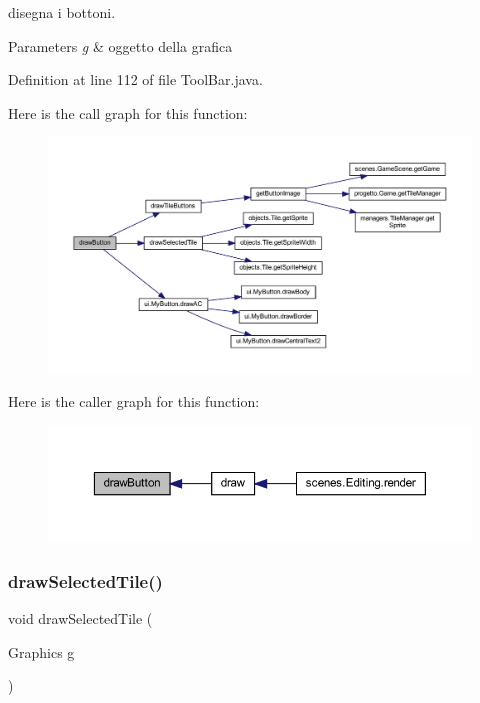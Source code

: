 disegna i bottoni. 


\begin{DoxyParams}{Parameters}
{\em g} & oggetto della grafica \\
\hline
\end{DoxyParams}


Definition at line 112 of file Tool\+Bar.\+java.

Here is the call graph for this function\+:
\nopagebreak
\begin{figure}[H]
\begin{center}
\leavevmode
\includegraphics[width=350pt]{classui_1_1_tool_bar_a65768678909bc0512c6cb9780709ad38_cgraph}
\end{center}
\end{figure}
Here is the caller graph for this function\+:\nopagebreak
\begin{figure}[H]
\begin{center}
\leavevmode
\includegraphics[width=350pt]{classui_1_1_tool_bar_a65768678909bc0512c6cb9780709ad38_icgraph}
\end{center}
\end{figure}
\mbox{\label{classui_1_1_tool_bar_aa0f35d91a41dfb53af7bdd7d4a76916f}} 
\subsubsection{\texorpdfstring{draw\+Selected\+Tile()}{drawSelectedTile()}}
{\footnotesize\ttfamily void draw\+Selected\+Tile (\begin{DoxyParamCaption}\item[{Graphics}]{g }\end{DoxyParamCaption})}



